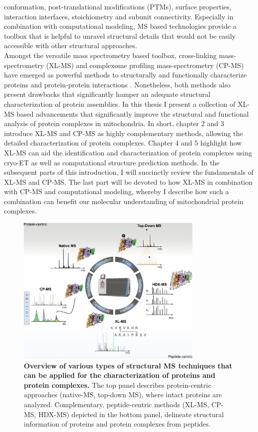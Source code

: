 conformation, post-translational modifications (PTMs), surface properties, interaction interfaces, stoichiometry and subunit connectivity. Especially in combination with computational modeling, MS based technologies provide a toolbox that is helpful to unravel structural details that would not be easily accessible with other structural approaches.\\
Amongst the versatile mass spectrometry based toolbox, cross-linking mass-spectrometry (XL-MS) and complexome profiling mass-spectrometry (CP-MS) have emerged as powerful methods to structurally and functionally characterize proteins and protein-protein interactions \cite{Steigenberger_2020}. Nonetheless, both methods also present drawbacks that significantly hamper an adequate structural characterization of protein assemblies. In this thesis I present a collection of XL-MS based advancements that significantly improve the structural and functional analysis of protein complexes in mitochondria. In short, chapter 2 and 3 introduce XL-MS and CP-MS as highly complementary methods, allowing the detailed characterization of protein complexes. Chapter 4 and 5 highlight how XL-MS can aid the identification and characterization of protein complexes using cryo-ET as well as computational structure prediction methods. In the subsequent parts of this introduction, I will succinctly review the fundamentals of XL-MS and CP-MS. The last part will be devoted to how XL-MS in combination with CP-MS and computational modeling, whereby I describe how such a combination can benefit our molecular understanding of mitochondrial protein complexes.

\begin{figure}[hbt!]
\center
\includegraphics[width=0.8\textwidth]{Chapter.1/Figures/Figure1} 
\caption{\textbf{Overview of various types of structural MS techniques that can be applied for the characterization of proteins and protein complexes.} The top panel describes protein-centric approaches (native-MS, top-down MS), where intact proteins are analyzed. Complementary, peptide-centric methods (XL-MS, CP-MS, HDX-MS) depicted in the bottom panel, delineate structural information of proteins and protein complexes from peptides.}
\label{fig:fig1}
\end{figure}

